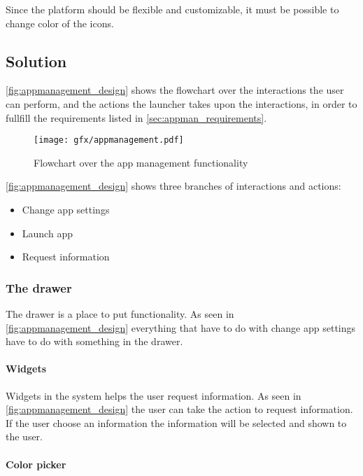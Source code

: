 Since the \giraf[] platform should be flexible and customizable, it must be possible to change color of the \giraf[] icons.






\subsection{Solution}
\label{sec:appman_solution}

\autoref{fig:appmanagement_design} shows the flowchart over the interactions the user can perform, and the actions the launcher takes upon the interactions, in order to fullfill the requirements listed in \autoref{sec:appman_requirements}.

\begin{figure}[h]
	\centering
	\texttt{[image: gfx/appmanagement.pdf]}
	\caption{Flowchart over the app management functionality}
	\label{fig:appmanagement_design}
\end{figure}

\autoref{fig:appmanagement_design} shows three branches of interactions and actions:

\begin{itemize}
	\item Change app settings
	\item Launch app
	\item Request information
\end{itemize}






\subsubsection{The drawer}
\label{sec:drawer}
The drawer is a place to put functionality. As seen in \autoref{fig:appmanagement_design} everything that have to do with change app settings have to do with something in the drawer.
\paragraph{Widgets}
\label{par:widgets}
Widgets in the \giraf[] system helps the user request information. As seen in \autoref{fig:appmanagement_design} the user can take the action to request information. If the user choose an information the information will be selected and shown to the user.

\paragraph{Color picker}
\label{par:colorpicker}
